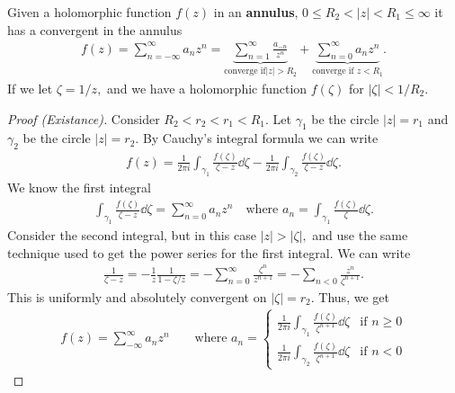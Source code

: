 \documentclass[a4paper,12pt]{article}
\begin{document}
\begin{definition}
    Given a holomorphic function $f(z)$ in an \textbf{annulus}, $0\leq R_2<|z|<R_1\leq\infty$ it has a convergent  in the annulus \begin{align}
        f(z)=\sum_{n=-\infty}^\infty a_nz^n=\underbrace{\sum_{n=1}^\infty\frac{a_{-n}}{z^n}}_{\text{converge if} |z|>R_2}+\underbrace{\sum_{n=0}^\infty a_nz^n}_{\text{converge if }z<R_1}.
    \end{align}
    If we let $\zeta=1/z,$ and we have a holomorphic function $f(\zeta)$ for $|\zeta|<1/R_2.$
    \begin{proof}[Proof (Existance)]
        Consider $R_2<r_2<r_1<R_1.$ Let $\gamma_1$ be the circle $|z|=r_1$ and $\gamma_2$ be the circle $|z|=r_2.$ By Cauchy's integral formula we can write \begin{align}
            f(z)=\frac{1}{2\pi i}\int_{\gamma_1}\frac{f(\zeta)}{\zeta-z}\dd\zeta-\frac{1}{2\pi i}\int_{\gamma_2}\frac{f(\zeta)}{\zeta-z}\dd\zeta.
        \end{align}
        We know the first integral \begin{align}
            \int_{\gamma_1}\frac{f(\zeta)}{\zeta-z}\dd\zeta=\sum_{n=0}^\infty a_nz^n\quad\text{where }a_n=\int_{\gamma_1}\frac{f(\zeta)}{\zeta}\dd\zeta.
        \end{align}
        Consider the second integral, but in this case $|z|>|\zeta|,$ and use the same technique used to get the power series for the first integral. We can write \begin{align}
            \frac{1}{\zeta-z}=-\frac{1}{z}\frac{1}{1-\zeta/z}=-\sum_{n=0}^\infty\frac{\zeta^n}{z^{n+1}}=-\sum_{n<0}\frac{z^n}{\zeta^{n+1}}.
        \end{align}
        This is uniformly and absolutely convergent on $|\zeta|=r_2.$ Thus, we get \begin{align}
            f(z)=\sum_{-\infty}^\infty a_nz^n\qquad\text{where }a_n=\begin{cases}
                \frac{1}{2\pi i}\int_{\gamma_1}\frac{f(\zeta)}{\zeta^{n+1}}\dd\zeta &\text{if }n\geq0\\
                \frac{1}{2\pi i}\int_{\gamma_2}\frac{f(\zeta)}{\zeta^{n+1}}\dd\zeta &\text{if }n<0
            \end{cases}
        \end{align}
    \end{proof}
\end{definition}
\end{document}
